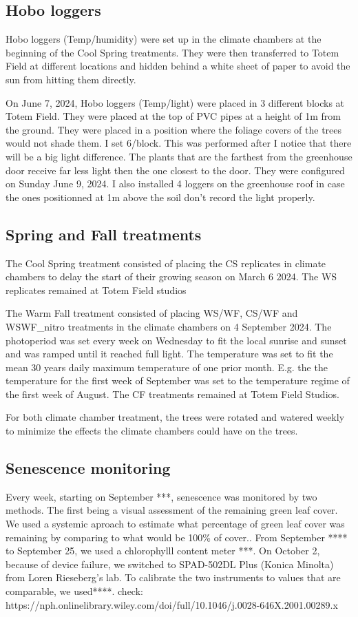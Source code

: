 \documentclass{article}
\begin{document}
\subsection{Hobo loggers}
Hobo loggers (Temp/humidity) were set up in the climate chambers at the beginning of the Cool Spring treatments. They were then transferred to Totem Field at different locations and hidden behind a white sheet of paper to avoid the sun from hitting them directly. 
\par 
On June 7, 2024, Hobo loggers (Temp/light) were placed in 3 different blocks at Totem Field. They were placed at the top of PVC pipes at a height of 1m from the ground. They were placed in a position where the foliage covers of the trees would not shade them. I set 6/block. This was performed after I notice that there will be a big light difference. The plants that are the farthest from the greenhouse door receive far less light then the one closest to the door. They were configured on Sunday June 9, 2024. I also installed 4 loggers on the greenhouse roof in case the ones positionned at 1m above the soil don't record the light properly. 

\subsection{Spring and Fall treatments}
The Cool Spring treatment consisted of placing the CS replicates in climate chambers to delay the start of their growing season on March 6 2024. The WS replicates remained at Totem Field studios
\par The Warm Fall treatment consisted of placing WS/WF, CS/WF and WSWF\_nitro treatments in the climate chambers on 4 September 2024. The photoperiod was set every week on Wednesday to fit the local sunrise and sunset and was ramped until it reached full light. The temperature was set to fit the mean 30 years daily maximum temperature of one prior month. E.g. the the temperature for the first week of September was set to the temperature regime of the first week of August. The CF treatments remained at Totem Field Studios. 
\par For both climate chamber treatment, the trees were rotated and watered weekly to minimize the effects the climate chambers could have on the trees.

\subsection  {Senescence monitoring}
Every week, starting on September ***, senescence was monitored by two methods. The first being a visual assessment of the remaining green leaf cover. We used a systemic aproach to estimate what percentage of green leaf cover was remaining by comparing to what would be 100\% of cover..
From September **** to September 25, we used a chlorophylll content meter ***. On October 2, because of device failure, we switched to SPAD-502DL Plus (Konica Minolta) from Loren Rieseberg's lab. To calibrate the two instruments to values that are comparable, we used****. check: https://nph.onlinelibrary.wiley.com/doi/full/10.1046/j.0028-646X.2001.00289.x
\end{document}
